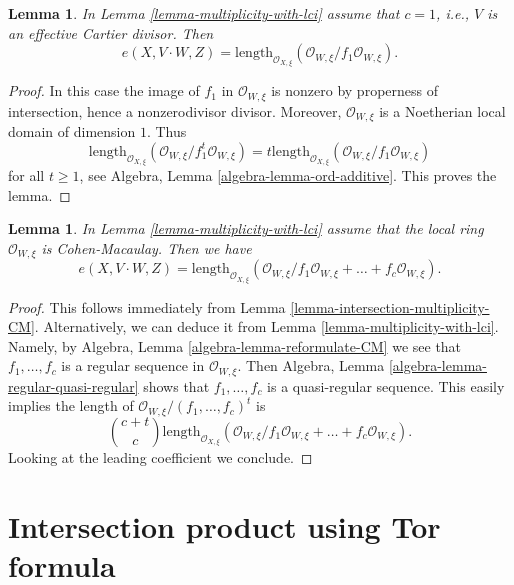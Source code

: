\documentclass{stacks-project}
\theoremstyle{plain}
\newtheorem{lemma}[subsection]{Lemma}
\theoremstyle{definition}
\theoremstyle{remark}
\numberwithin{equation}{subsection}
\begin{document}
\begin{lemma}
\label{lemma-multiplicity-with-effective-Cartier-divisor}
In Lemma \ref{lemma-multiplicity-with-lci} assume that  $c = 1$, i.e., $V$
is an effective Cartier divisor. Then
$$
e(X, V \cdot W, Z) =
\text{length}_{\mathcal{O}_{X, \xi}}
(\mathcal{O}_{W, \xi}/f_1\mathcal{O}_{W, \xi}).
$$
\end{lemma}

\begin{proof}
In this case the image of $f_1$ in $\mathcal{O}_{W, \xi}$ is nonzero by
properness of intersection, hence a nonzerodivisor divisor. Moreover,
$\mathcal{O}_{W, \xi}$ is a Noetherian local domain of dimension $1$.
Thus
$$
\text{length}_{\mathcal{O}_{X, \xi}}
(\mathcal{O}_{W, \xi}/f_1^t\mathcal{O}_{W, \xi}) =
t \text{length}_{\mathcal{O}_{X, \xi}}
(\mathcal{O}_{W, \xi}/f_1\mathcal{O}_{W, \xi})
$$
for all $t \geq 1$, see Algebra, Lemma \ref{algebra-lemma-ord-additive}.
This proves the lemma.
\end{proof}

\begin{lemma}
\label{lemma-multiplicity-lci-CM}
In Lemma \ref{lemma-multiplicity-with-lci} assume that
the local ring $\mathcal{O}_{W, \xi}$ is Cohen-Macaulay. Then we
have
$$
e(X, V \cdot W, Z) =
\text{length}_{\mathcal{O}_{X, \xi}} (\mathcal{O}_{W, \xi}/
f_1\mathcal{O}_{W, \xi} + \ldots + f_c\mathcal{O}_{W, \xi}).
$$
\end{lemma}

\begin{proof}
This follows immediately from Lemma \ref{lemma-intersection-multiplicity-CM}.
Alternatively, we can deduce it from Lemma \ref{lemma-multiplicity-with-lci}.
Namely, by Algebra, Lemma \ref{algebra-lemma-reformulate-CM}
we see that $f_1, \ldots, f_c$ is a regular sequence in
$\mathcal{O}_{W, \xi}$. Then
Algebra, Lemma \ref{algebra-lemma-regular-quasi-regular} shows that
$f_1, \ldots, f_c$ is a quasi-regular sequence.
This easily implies the length of
$\mathcal{O}_{W, \xi}/(f_1, \ldots, f_c)^t$ is
$$
{c + t \choose c}
\text{length}_{\mathcal{O}_{X, \xi}} (\mathcal{O}_{W, \xi}/
f_1\mathcal{O}_{W, \xi} + \ldots + f_c\mathcal{O}_{W, \xi}).
$$
Looking at the leading coefficient we conclude.
\end{proof}


\section{Intersection product using Tor formula}
\label{section-intersection-product}
\end{document}
